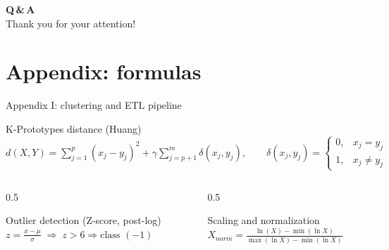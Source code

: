 \documentclass[aspectratio=169,11pt]{beamer}
\begin{document}
{
\begin{frame}[plain]
  \begin{center}
    \vspace*{\fill}
    {\color{white}\fontsize{40}{44}\selectfont\bfseries Q\,\&\,A}\\[20pt]
    {\color{hosplight}\Large Thank you for your attention!}
    \vspace*{\fill}
  \end{center}
\end{frame}}

\appendix
\section{Appendix: formulas}

\begin{frame}{Appendix I: clustering and ETL pipeline}
  \small
  \begin{block}{K-Prototypes distance (Huang)}
    \centering
    $\displaystyle d(X,Y)=\sum_{j=1}^{p}(x_j-y_j)^2+\gamma\sum_{j=p+1}^{m}\delta(x_j,y_j),\qquad
      \delta(x_j,y_j)=\begin{cases}0,&x_j=y_j\\[2pt]1,&x_j\neq y_j\end{cases}$
  \end{block}
  \begin{columns}[T]
    \begin{column}{0.5\textwidth}
      \begin{block}{Outlier detection (Z-score, post-log)}
        \centering
        $\displaystyle z=\frac{x-\mu}{\sigma}\;\Rightarrow\; z>6 \Rightarrow \text{class }(-1)$
      \end{block}
    \end{column}
    \begin{column}{0.5\textwidth}
      \begin{block}{Scaling and normalization}
        \centering
        $\displaystyle X_{norm}=\frac{\ln(X)-\min(\ln X)}{\max(\ln X)-\min(\ln X)}$
      \end{block}
    \end{column}
  \end{columns}
\end{frame}
\end{document}
